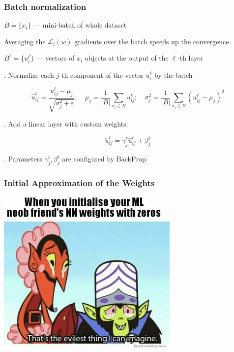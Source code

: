\documentclass[fullscreen=true, bookmarks=true, hyperref={pdfencoding=unicode}]{beamer}
\begin{document}
\begin{frame}
  \frametitle{Batch normalization}

  $B = \{ x_i\}$ — mini-batch of whole dataset

  Averaging the $\mathcal{L}_i(w)$ gradients over the batch speeds up the convergence.

   $B^\ell = \{ u_i^\ell\}$ — vectors of $x_i$ objects at the output of the $\ell$-th layer

  . Normalize each $j$-th component of the vector $u_i^\ell$ by the batch

  $$
    \hat u_{ij}^\ell = \frac{u_{ij}^\ell - \mu_j}{\sqrt{\sigma_j^2 + \varepsilon}}; \quad
    \mu_j = \frac{1}{|B|} \sum\limits_{x_i \in B} u_{ij}^\ell; \quad
    \sigma_j^2 = \frac{1}{|B|} \sum\limits_{x_i \in B} (u_{ij}^\ell - \mu_j)^2
  $$

  . Add a linear layer with custom weights:

   $$ \tilde u_{ij}^\ell = \gamma_j^\ell \hat u_{ij}^\ell + \beta_j^\ell $$

  . Parameters $\gamma_j^\ell, \beta_j^\ell$ are configured by BackProp
\end{frame}


\begin{frame}
  \frametitle{Initial Approximation of the Weights}
  \begin{center}
    \includegraphics[keepaspectratio,
                     width=.4\paperwidth]{weight_init_meme.jpg}
  \end{center}
\end{frame}
\end{document}
